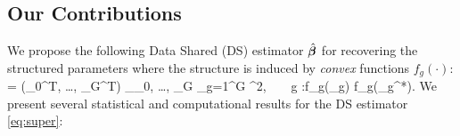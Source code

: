 \subsection{Our Contributions}
We propose the following Data Shared (DS) estimator $\hat{\boldsymbol{\beta}}$ for recovering the structured parameters where the structure is induced by \emph{convex} functions $f_g(\cdot)$:
{\small\beq
	\label{eq:super}
	\hbbe = (\hbbe_0^T, \dots, \hbbe_G^T) \in \argmin_{\bbeta _0, \dots, \bbeta _G}  \sum_{g=1}^{G} ^2,
	~ ~ \forall g \in [G_+]:f_g(\bbeta _g) \leq f_g(\bbeta _g^*).
\eeq}
We present several statistical and computational results for the DS estimator \cref{eq:super}:
